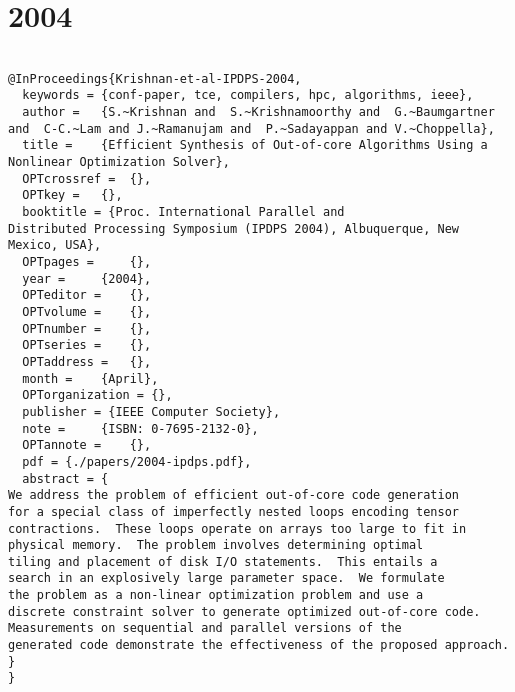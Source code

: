 \documentclass[11pt]{article}
\begin{document}
\section{2004}
\label{sec:org7733463}
\lstset{language=bibtex,label= ,caption= ,captionpos=b,numbers=none}
\begin{lstlisting}

@InProceedings{Krishnan-et-al-IPDPS-2004,
  keywords = {conf-paper, tce, compilers, hpc, algorithms, ieee},
  author = 	 {S.~Krishnan and  S.~Krishnamoorthy and  G.~Baumgartner and  C-C.~Lam and J.~Ramanujam and  P.~Sadayappan and V.~Choppella},
  title = 	 {Efficient Synthesis of Out-of-core Algorithms Using a Nonlinear Optimization Solver},
  OPTcrossref =  {},
  OPTkey = 	 {},
  booktitle = {Proc. International Parallel and
Distributed Processing Symposium (IPDPS 2004), Albuquerque, New Mexico, USA},
  OPTpages = 	 {},
  year = 	 {2004},
  OPTeditor = 	 {},
  OPTvolume = 	 {},
  OPTnumber = 	 {},
  OPTseries = 	 {},
  OPTaddress = 	 {},
  month = 	 {April},
  OPTorganization = {},
  publisher = {IEEE Computer Society},
  note = 	 {ISBN: 0-7695-2132-0},
  OPTannote = 	 {},
  pdf = {./papers/2004-ipdps.pdf},
  abstract = {
We address the problem of efficient out-of-core code generation
for a special class of imperfectly nested loops encoding tensor
contractions.  These loops operate on arrays too large to fit in
physical memory.  The problem involves determining optimal
tiling and placement of disk I/O statements.  This entails a
search in an explosively large parameter space.  We formulate
the problem as a non-linear optimization problem and use a
discrete constraint solver to generate optimized out-of-core code.
Measurements on sequential and parallel versions of the
generated code demonstrate the effectiveness of the proposed approach.
}
}



\end{lstlisting}
\end{document}
